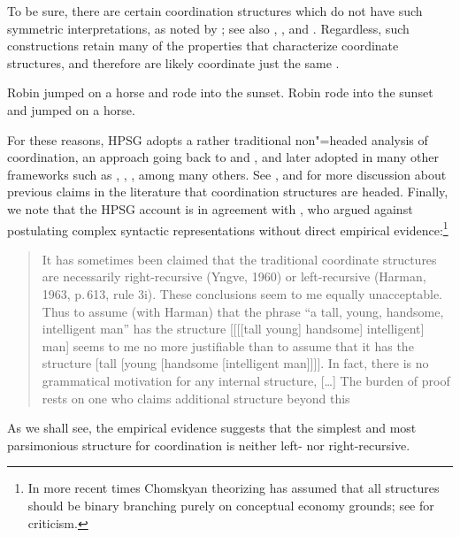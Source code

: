 \documentclass[output=paper]{langsci/langscibook}
\begin{document}
\noindent
To be sure, there are certain coordination structures which do not have such symmetric 
interpretations, as noted by \citet{ross67}; see also
\citet{goldsmith}, \citet{lakoff86}, and \citet{levinprince86}.
Regardless, such constructions retain many of the properties that characterize coordinate structures, and therefore are likely 
coordinate just the same \citep[Chapter 5]{kehler}.

\begin{exe}
\ex
\begin{xlista}
\ex Robin jumped on a horse and rode into the sunset.
\ex Robin rode into the sunset and jumped on a horse.
\end{xlista}
\end{exe}

For these reasons, HPSG adopts a rather traditional non"=headed analysis of coordination, an approach  going back
to \citet[195]{bloom} and  \citet{ross67}, and later adopted in many other frameworks such as \citet{pesetsky}, \citet{gazdarc},  \citet[1275]{rodney}, among many others. 
See \citet{borsley94}, \citet{Borsley:05} and 
\citet[Chaves 2]{chavesthesis} for more discussion about previous claims in the literature that coordination structures are headed.
Finally, we note that the HPSG account is in agreement with \citet[196]{chom65}, who argued against postulating complex syntactic representations without direct empirical evidence:\footnote{In more recent times Chomskyan theorizing has assumed that all structures should be binary branching purely on conceptual economy grounds; see \citet{Johnson:Lappin:99} for criticism.}

\begin{quote}
It has sometimes been claimed that the traditional coordinate structures are necessarily right-recursive (Yngve, 1960) or left-recursive (Harman, 1963, p.\,613, rule 3i). These conclusions seem to me equally unacceptable. Thus to assume (with Harman) that the phrase “a tall, young, handsome, intelligent man” has the structure [[[[tall young] handsome] intelligent] man] seems to me no more justifiable than to assume that it has
the structure [tall [young [handsome [intelligent man]]]]. In fact, there is no grammatical
motivation for any internal structure, [\ldots] The burden of proof rests on one who claims additional
structure beyond this \citep[196--197]{chom65}
\end{quote}

\noindent
As we shall see, the empirical evidence suggests that
the simplest and most parsimonious structure for coordination is neither left- nor right-recursive.
\end{document}

